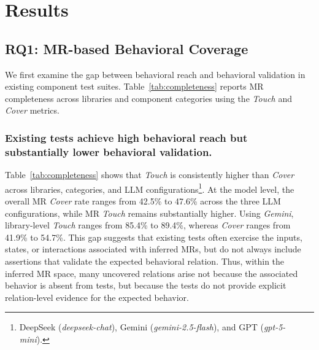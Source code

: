 \section{Results}\label{sec:result_analysis}

\subsection{RQ1: MR-based Behavioral Coverage}\label{sec:results:rq1}
We first examine the gap between behavioral reach and behavioral validation in existing component test suites.
Table~\ref{tab:completeness} reports MR completeness across libraries and component categories using the \textit{Touch} and \textit{Cover} metrics.

\subsubsection{Existing tests achieve high behavioral reach but substantially lower behavioral validation.} 
Table~\ref{tab:completeness} shows that \textit{Touch} is consistently higher than \textit{Cover} across libraries, categories, and LLM configurations\footnote{DeepSeek (\textit{deepseek-chat}), Gemini (\textit{gemini-2.5-flash}), and GPT (\textit{gpt-5-mini}).}. At the model level, the overall MR \textit{Cover} rate ranges from 42.5\% to 47.6\% across the three LLM configurations, while MR \textit{Touch} remains substantially higher.
Using \textit{Gemini}, library-level \textit{Touch} ranges from 85.4\% to 89.4\%, whereas \textit{Cover} ranges from 41.9\% to 54.7\%. This gap suggests that existing tests often exercise the inputs, states, or interactions associated with inferred MRs, but do not always include assertions that validate the expected behavioral relation. Thus, within the inferred MR space, many uncovered relations arise not because the associated behavior is absent from tests, but because the tests do not provide explicit relation-level evidence for the expected behavior.

